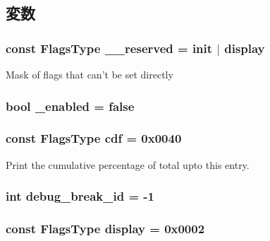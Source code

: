 \subsection{変数}
\hypertarget{namespaceStats_a18e4982df9983fc1af85ce62a8020c52}{
\subsubsection[{\_\-\_\-reserved}]{\setlength{\rightskip}{0pt plus 5cm}const {\bf FlagsType} {\bf \_\-\_\-reserved} = {\bf init} $|$ {\bf display}}}
\label{namespaceStats_a18e4982df9983fc1af85ce62a8020c52}
Mask of flags that can't be set directly \hypertarget{namespaceStats_a096e979db21287ad2b56b0ad270ac681}{
\subsubsection[{\_\-enabled}]{\setlength{\rightskip}{0pt plus 5cm}bool {\bf \_\-enabled} = false}}
\label{namespaceStats_a096e979db21287ad2b56b0ad270ac681}
\hypertarget{namespaceStats_af659db47be37cf4f7fee0a18e320843b}{
\subsubsection[{cdf}]{\setlength{\rightskip}{0pt plus 5cm}const {\bf FlagsType} {\bf cdf} = 0x0040}}
\label{namespaceStats_af659db47be37cf4f7fee0a18e320843b}
Print the cumulative percentage of total upto this entry. \hypertarget{namespaceStats_a7f54f6f0dfb010de4011aaad5d2922e8}{
\subsubsection[{debug\_\-break\_\-id}]{\setlength{\rightskip}{0pt plus 5cm}int {\bf debug\_\-break\_\-id} = -\/1}}
\label{namespaceStats_a7f54f6f0dfb010de4011aaad5d2922e8}
\hypertarget{namespaceStats_a4f0406c9859ba486a98825d53a233056}{
\subsubsection[{display}]{\setlength{\rightskip}{0pt plus 5cm}const {\bf FlagsType} {\bf display} = 0x0002}}
